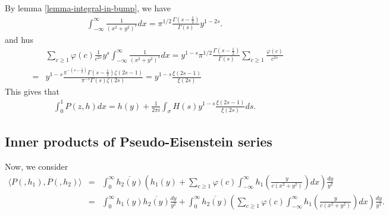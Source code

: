 \documentclass[11pt,reqno]{amsart}
\newcommand{\bea}{\begin{eqnarray}}
\newcommand{\eea}{\end{eqnarray}}
\newcommand{\bna}{\begin{eqnarray*}}
\newcommand{\ena}{\end{eqnarray*}}
\theoremstyle{definition}
\begin{document}
By lemma \ref{lemma-integral-in-bump}, we have
\bna
\int_{-\infty}^\infty \frac{1}{(x^2+y^2)^s}dx=\pi^{1/2}\frac{\Gamma(s-\frac{1}{2})}{\Gamma(s)}y^{1-2s}.
\ena
and hus
\bna
&&\sum_{c\geq 1}\varphi(c)\frac{1}{c^{2s}}y^s\int_{-\infty}^\infty \frac{1}{(x^2+y^2)^s}dx
=y^{1-s}\pi^{1/2}\frac{\Gamma(s-\frac{1}{2})}{\Gamma(s)}\sum_{c\geq 1}\frac{\varphi(c)}{c^{2s}}\\
&=&y^{1-s}\frac{\pi^{-(s-\frac{1}{2})}\Gamma(s-\frac{1}{2})\zeta(2s-1)}{\pi^{-s}\Gamma(s)\zeta(2s)}
=y^{1-s}\frac{\xi(2s-1)}{\xi(2s)}
\ena
This gives that
\bea
\int_0^1P(z,h)dx=h(y) +
\frac{1}{2\pi i}\int_{\sigma} H(s)y^{1-s}\frac{\xi(2s-1)}{\xi(2s)}ds.\label{constant-term-P-Eisenstein-series}
\eea
\subsection{Inner products of Pseudo-Eisenstein series}
Now, we consider
\bna
\langle P(,h_1),P(,h_2)\rangle&=&\int_0^\infty \overline {h_2(y)}
\left(h_1(y) + \sum_{c\geq 1}\varphi(c)\int_{-\infty}^\infty h_1\left(\frac{y}{c(x^2+y^2)}\right)dx\right)
\frac{dy}{y^2}\\
&=&\int_{0}^\infty h_1(y)\overline{h_2(y)}\frac{dy}{y^2}
+\int_{0}^\infty\overline{h_2(y)} \left(\sum_{c\geq 1}\varphi(c)\int_{-\infty}^\infty h_1\left(\frac{y}{c(x^2+y^2)}\right)dx\right)\frac{dy}{y^2}.
\ena
\end{document}
